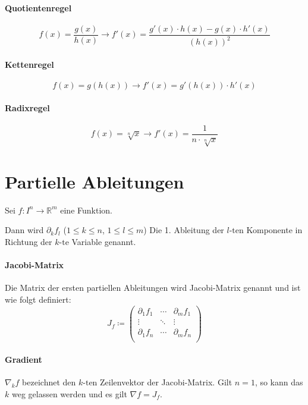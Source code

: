 			\paragraph{Quotientenregel}
				\[ f(x) = \frac{g(x)}{h(x)} \rightarrow f'(x) = \frac{g'(x) \cdot h(x) - g(x) \cdot h'(x)}{(h(x)) ^ 2} \]

			\paragraph{Kettenregel}
				\[ f(x) = g(h(x)) \rightarrow f'(x) = g'(h(x)) \cdot h'(x) \]

			\paragraph{Radixregel}
				\[ f(x) = \sqrt[n]{x} \rightarrow f'(x) = \frac{1}{n \cdot \sqrt[n]{x}} \]

	\section{Partielle Ableitungen}
		Sei $ f : I ^ n \rightarrow \mathbb{R} ^ m $ eine Funktion.

		Dann wird $ \partial _ k f _ l $ ($ 1 \leq k \leq n $, $ 1 \leq l \leq m $) Die 1. Ableitung der $ l\text{-ten} $ Komponente in Richtung der $ k\text{-te} $ Variable genannt.

		\paragraph{Jacobi-Matrix}
			Die Matrix der ersten partiellen Ableitungen wird Jacobi-Matrix genannt und ist wie folgt definiert:
			\begin{equation*}
				J _ f \coloneqq
				\begin{pmatrix}
					\partial _ 1 f _ 1 & \cdots & \partial _ m f _ 1 \\
					\vdots             & \ddots & \vdots             \\
					\partial _ 1 f _ n & \cdots & \partial _ m f _ n \\
				\end{pmatrix}
			\end{equation*}

		\paragraph{Gradient}
			$ \nabla _ k f $ bezeichnet den $ k\text{-ten} $ Zeilenvektor der Jacobi-Matrix. Gilt $ n = 1 $, so kann das $ k $ weg gelassen werden und es gilt $ \nabla f = J _ f $.


